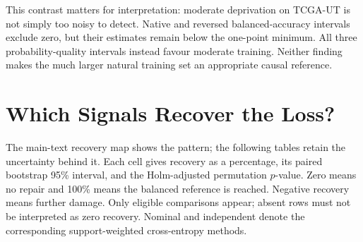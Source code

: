 \begin{table}[H]
\centering\small\setlength{\tabcolsep}{4pt}

\caption{Balanced-accuracy loss in percentage points, with paired 95\% intervals. Eligibility requires both the dataset's minimum deficit and an interval excluding zero. TCGA-UT moderate has small positive estimates, not an established absence of loss.}
\label{tab:discrimination-deficit}
\end{table}

\begin{table}[H]
\centering\small\setlength{\tabcolsep}{4pt}

\caption{Tail-group negative-log-likelihood increase in nats, with paired 95\% intervals. Negative values mean improved probability quality. TCGA-UT moderate improves this endpoint under all three assignments, even though balanced accuracy falls slightly.}
\label{tab:calibration-deficit}
\end{table}

\noindent This contrast matters for interpretation: moderate deprivation on TCGA-UT is not simply too noisy to detect. Native and reversed balanced-accuracy intervals exclude zero, but their estimates remain below the one-point minimum. All three probability-quality intervals instead favour moderate training. Neither finding makes the much larger natural training set an appropriate causal reference.

\clearpage
\section{Which Signals Recover the Loss?}
\label{app:recovery-estimates}
The main-text recovery map shows the pattern; the following tables retain the uncertainty behind it. Each cell gives recovery as a percentage, its paired bootstrap 95\% interval, and the Holm-adjusted permutation $p$-value. Zero means no repair and 100\% means the balanced reference is reached. Negative recovery means further damage. Only eligible comparisons appear; absent rows must not be interpreted as zero recovery. Nominal and independent denote the corresponding support-weighted cross-entropy methods.

\begin{table}[H]
\centering\footnotesize\setlength{\tabcolsep}{3pt}\renewcommand{\arraystretch}{1.35}

\caption{BRACS discrimination recovery (\%). Prevalence and nominal-support weighting repair nominal deprivation, while patient shortage remains unrepaired. Each cell retains estimate, interval, and adjusted $p$-value.}
\label{tab:confirmatory-detail}
\end{table}
\begin{table}[H]
\centering\footnotesize\setlength{\tabcolsep}{3pt}\renewcommand{\arraystretch}{1.35}

\caption{TCGA-UT discrimination recovery (\%). Moderate is omitted because it fails the materiality criterion. Independent-support weighting helps severe spread in some assignments but does not repair patient shortage itself.}
\label{tab:confirmatory-tcga}
\end{table}

